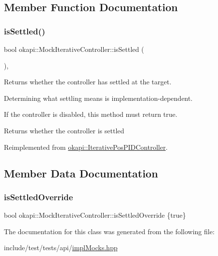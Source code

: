 \subsection{Member Function Documentation}
\mbox{\label{classokapi_1_1MockIterativeController_a25901732ebc3b8ea82ed5c024071f4a4}} 
\subsubsection{\texorpdfstring{isSettled()}{isSettled()}}
{\footnotesize\ttfamily bool okapi\+::\+Mock\+Iterative\+Controller\+::is\+Settled (\begin{DoxyParamCaption}{ }\end{DoxyParamCaption})\hspace{0.3cm}{\ttfamily [override]}, {\ttfamily [virtual]}}



Returns whether the controller has settled at the target. 

Determining what settling means is implementation-\/dependent.

If the controller is disabled, this method must return true.

\begin{DoxyReturn}{Returns}
whether the controller is settled 
\end{DoxyReturn}


Reimplemented from \mbox{\hyperlink{classokapi_1_1IterativePosPIDController_a856b633717128607fa8f1b52d91f89d6}{okapi\+::\+Iterative\+Pos\+P\+I\+D\+Controller}}.



\subsection{Member Data Documentation}
\mbox{\label{classokapi_1_1MockIterativeController_a30b65d74b272a8a1ff7747d4baf4e4dd}} 
\subsubsection{\texorpdfstring{isSettledOverride}{isSettledOverride}}
{\footnotesize\ttfamily bool okapi\+::\+Mock\+Iterative\+Controller\+::is\+Settled\+Override \{true\}}



The documentation for this class was generated from the following file\+:\begin{DoxyCompactItemize}
\item 
include/test/tests/api/\mbox{\hyperlink{implMocks_8hpp}{impl\+Mocks.\+hpp}}\end{DoxyCompactItemize}
